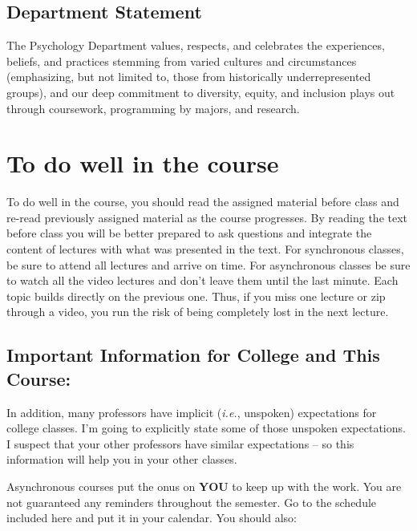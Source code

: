 \documentclass[11pt,]{article}
\begin{document}
\hypertarget{department-statement}{%
\subsection{Department Statement}\label{department-statement}}

The Psychology Department values, respects, and celebrates the
experiences, beliefs, and practices stemming from varied cultures and
circumstances (emphasizing, but not limited to, those from historically
underrepresented groups), and our deep commitment to diversity, equity,
and inclusion plays out through coursework, programming by majors, and
research.

\hypertarget{to-do-well-in-the-course}{%
\section{To do well in the course}\label{to-do-well-in-the-course}}

To do well in the course, you should read the assigned material before
class and re-read previously assigned material as the course progresses.
By reading the text before class you will be better prepared to ask
questions and integrate the content of lectures with what was presented
in the text. For synchronous classes, be sure to attend all lectures and
arrive on time. For asynchronous classes be sure to watch all the video
lectures and don't leave them until the last minute. Each topic builds
directly on the previous one. Thus, if you miss one lecture or zip
through a video, you run the risk of being completely lost in the next
lecture.

\hypertarget{important-information-for-college-and-this-course}{%
\subsection{Important Information for College and This
Course:}\label{important-information-for-college-and-this-course}}

In addition, many professors have implicit (\emph{i.e.}, unspoken)
expectations for college classes. I'm going to explicitly state some of
those unspoken expectations. I suspect that your other professors have
similar expectations -- so this information will help you in your other
classes.

Asynchronous courses put the onus on \textbf{YOU} to keep up with the
work. You are not guaranteed any reminders throughout the semester. Go
to the schedule included here and put it in your calendar. You should
also:
\end{document}
